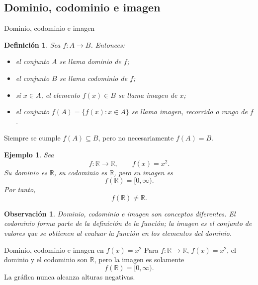 \documentclass[aspectratio=169,10pt]{beamer}
\newtheorem{definicion}{Definición}
\newtheorem{observacion}{Observación}
\newtheorem{ejemplo}{Ejemplo}
\newcommand{\R}{\mathbb{R}}
\begin{document}
\subsection*{Dominio, codominio e imagen}
\begin{frame}{Dominio, codominio e imagen}

\begin{definicion}
Sea $f:A\to B$. Entonces:

\begin{itemize}
    \item el conjunto $A$ se llama \emph{dominio} de $f$;
    \item el conjunto $B$ se llama \emph{codominio} de $f$;
    \item si $x\in A$, el elemento $f(x)\in B$ se llama \emph{imagen} de $x$;
    \item el conjunto $f(A)=\{f(x):x\in A\}$ se llama \emph{imagen}, \emph{recorrido} o \emph{rango} de $f$.
\end{itemize}
\end{definicion}

Siempre se cumple $f(A)\subseteq B$, pero no necesariamente $f(A)=B$.

\begin{ejemplo}
Sea
\[
f:\R\to\R,\qquad f(x)=x^2.
\]
Su dominio es $\R$, su codominio es $\R$, pero su imagen es
\[
f(\R)=[0,\infty).
\]
Por tanto,
\[
f(\R)\neq\R.
\]

\end{ejemplo}

\begin{observacion}
Dominio, codominio e imagen son conceptos diferentes. El codominio forma parte de la definición de la función; la imagen es el conjunto de valores que se obtienen al evaluar la función en los elementos del dominio.
\end{observacion}

\end{frame}

\begin{frame}{Dominio, codominio e imagen en $f(x)=x^2$}
Para $f:\mathbb{R}\to\mathbb{R}$, $f(x)=x^2$, el dominio y el codominio son
$\mathbb{R}$, pero la imagen es solamente
\[
f(\mathbb{R})=[0,\infty).
\]
La gráfica nunca alcanza alturas negativas.
\begin{center}
\end{center}
\end{frame}
\end{document}
